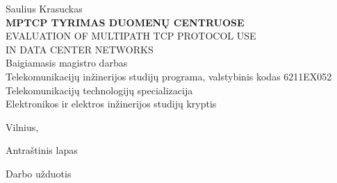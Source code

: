 \documentclass[12pt]{article}
\begin{document}
\begin{titlepage}
    {\large Saulius Krasuckas}
                                                          \\[24.5pt]
    {\large{\bfseries{MPTCP TYRIMAS DUOMENŲ CENTRUOSE}}}
                                                          \\[-5.0pt]
    {\large{EVALUATION OF MULTIPATH TCP PROTOCOL USE      \\
                   IN DATA CENTER NETWORKS}}
                                                          \\[36.5pt]

    {\large Baigiamasis magistro darbas}
                                                          \\[1.9pt]
    Telekomunikacijų inžinerijos studijų programa,
    valstybinis kodas 6211EX052                           \\
    Telekomunikacijų technologijų specializacija          \\
    Elektronikos ir elektros inžinerijos studijų kryptis  \\

    \vspace{\fill}

    Vilnius, \the\year

\end{titlepage}


\begin{titlepage}
\centering

    {\Large Antraštinis lapas}

\end{titlepage}
\restoregeometry                       %
\newpage


\begin{titlepage}
\centering

    {\Large Darbo užduotis}

\end{titlepage}
\newpage

\end{document}
